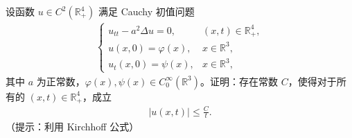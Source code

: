\documentclass[../../main.tex]{subfiles}%
\begin{document}
\begin{example}
设函数 $u\in C^2(\mathbb{R}_+^4)$ 满足 Cauchy 初值问题
\begin{align*}
\begin{cases}
u_{tt}-a^2\Delta u=0, & (x,t)\in\mathbb{R}_+^4, \\
u(x,0)=\varphi(x), & x\in\mathbb{R}^3, \\
u_t(x,0)=\psi(x), & x\in\mathbb{R}^3,
\end{cases}
\end{align*}
其中 $a$ 为正常数，$\varphi(x),\psi(x)\in C_0^\infty(\mathbb{R}^3)$。证明：存在常数 $C$，使得对于所有的 $(x,t)\in\mathbb{R}_+^4$，成立
\begin{align*}
|u(x,t)|\leqslant \frac{C}{t}.
\end{align*}
（提示：利用 Kirchhoff 公式）
\end{example}
\end{document}
